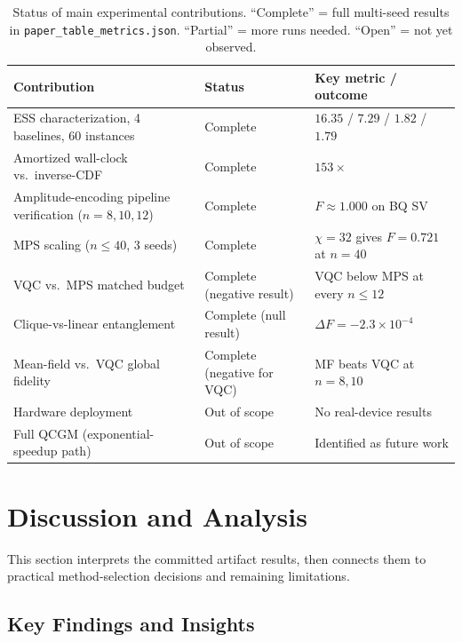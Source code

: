 \documentclass[conference,10pt]{IEEEtran}
\begin{document}
\begin{table}[t]
\centering
\caption{Status of main experimental contributions. ``Complete'' = full multi-seed results in \texttt{paper\_table\_metrics.json}. ``Partial'' = more runs needed. ``Open'' = not yet observed.}
\label{tab:status}
\begin{tabular}{p{3.2cm}p{1.4cm}p{3.0cm}}
\toprule
\textbf{Contribution} & \textbf{Status} & \textbf{Key metric / outcome} \\
\midrule
ESS characterization, 4 baselines, 60 instances & Complete & $16.35$ / $7.29$ / $1.82$ / $1.79$ \\
\addlinespace
Amortized wall-clock vs.\ inverse-CDF & Complete & $153\times$ \\
\addlinespace
Amplitude-encoding pipeline verification ($n=8,10,12$) & Complete & $F \approx 1.000$ on BQ SV \\
\addlinespace
MPS scaling ($n\leq40$, 3 seeds) & Complete & $\chi=32$ gives $F=0.721$ at $n=40$ \\
\addlinespace
VQC vs.\ MPS matched budget & Complete (negative result) & VQC below MPS at every $n \le 12$ \\
\addlinespace
Clique-vs-linear entanglement & Complete (null result) & $\Delta F = -2.3\times10^{-4}$ \\
\addlinespace
Mean-field vs.\ VQC global fidelity & Complete (negative for VQC) & MF beats VQC at $n=8,10$ \\
\addlinespace
Hardware deployment & Out of scope & No real-device results \\
\addlinespace
Full QCGM (exponential-speedup path) & Out of scope & Identified as future work \\
\bottomrule
\end{tabular}
\end{table}

\section{Discussion and Analysis}

This section interprets the committed artifact results, then connects them to practical method-selection decisions and remaining limitations.

\subsection{Key Findings and Insights}
\end{document}

